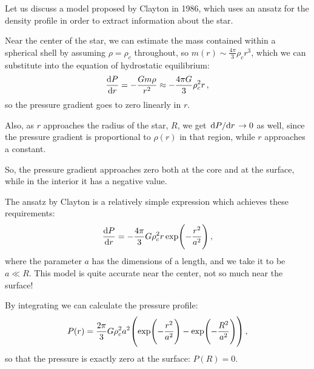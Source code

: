 \documentclass[main.tex]{subfiles}
\begin{document}
Let us discuss a model proposed by Clayton in 1986, which uses an ansatz for the density profile in order to extract information about the star.


Near the center of the star, we can estimate the mass contained within a spherical shell by assuming \(\rho = \rho _c\) throughout, so \(m(r) \sim \frac{4 \pi }{3} \rho _c r^3\), which we can substitute into the equation of hydrostatic equilibrium:
%
\begin{align}
  \dv{P}{r} = - \frac{Gm \rho }{r^2} \approx -\frac{4 \pi G}{3} \rho^2_c r 
\,,
\end{align}
%
so the pressure gradient goes to zero linearly in \(r\). 


Also, as \(r\) approaches the radius of the star, \(R\), we get \(\dv*{P}{r} \rightarrow 0\) as well, since the pressure gradient is proportional to \(\rho (r)\) in that region, while \(r\) approaches a constant. 

So, the pressure gradient approaches zero both at the core and at the surface, while in the interior it has a negative value.

The ansatz by Clayton is a relatively simple expression which achieves these requirements: 
%
\begin{align}
  \dv{P}{r} = -\frac{4 \pi }{3} G \rho _c^2 r \exp(- \frac{r^2}{a^2})
\,,
\end{align}
%
where the parameter \(a\) has the dimensions of a length, and we take it to be \(a \ll R \).
This model is quite accurate near the center, not so much near the surface! 

By integrating we can calculate the pressure profile:
%
\begin{align}
  P(r) = \frac{2 \pi }{3} G \rho_c^2 a^2 \qty(\exp(- \frac{r^2}{a^2}) - \exp(- \frac{R^2}{a^2}))
\,,
\end{align}
%
so that the pressure is exactly zero at the surface: \(P(R) = 0\).
\end{document}
